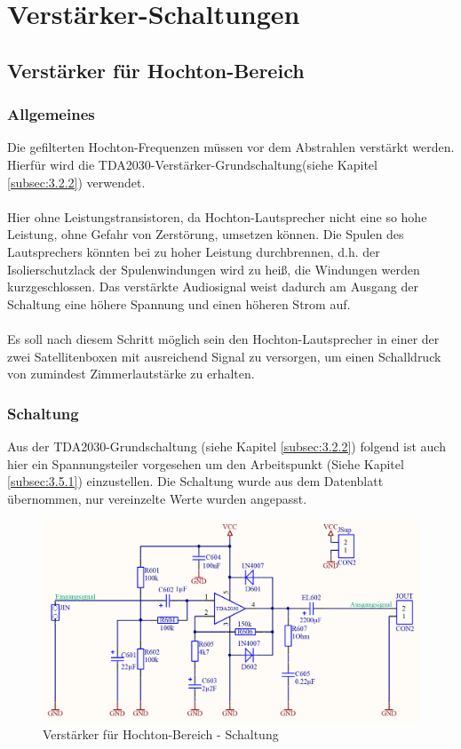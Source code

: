 \section{Verstärker-Schaltungen}


\subsection{Verstärker für Hochton-Bereich}
\subsubsection{Allgemeines}\label{subsec:4.5.1}
Die gefilterten Hochton-Frequenzen müssen vor dem Abstrahlen verstärkt werden.
Hierfür wird die TDA2030-Verstärker-Grundschaltung(siehe Kapitel \ref{subsec:3.2.2}) verwendet.
\\ \\
Hier ohne Leistungstransistoren, da Hochton-Lautsprecher nicht eine so hohe Leistung, ohne Gefahr von Zerstörung, umsetzen können.
Die Spulen des Lautsprechers könnten bei zu hoher Leistung durchbrennen, d.h. der Isolierschutzlack der Spulenwindungen wird zu heiß, die Windungen werden kurzgeschlossen.
Das verstärkte Audiosignal weist dadurch am Ausgang der Schaltung eine höhere Spannung und einen höheren Strom auf.
\\ \\
Es soll nach diesem Schritt möglich sein den Hochton-Lautsprecher in einer der zwei Satellitenboxen mit ausreichend Signal zu versorgen, um einen Schalldruck von zumindest Zimmerlautstärke zu erhalten. 

\newpage
\subsubsection{Schaltung}\label{subsec:4.5.2}
Aus der TDA2030-Grundschaltung (siehe Kapitel \ref{subsec:3.2.2}) folgend ist auch hier ein Spannungsteiler vorgesehen um den Arbeitspunkt (Siehe Kapitel \ref{subsec:3.5.1}) einzustellen.
Die Schaltung wurde aus dem Datenblatt übernommen, nur vereinzelte Werte wurden angepasst. 

\begin{figure} [H]
	\centering	
	\includegraphics[width=1\textwidth]{img/Print6/HTVerstaerker-Schem.PNG}
	\caption{Verstärker für Hochton-Bereich - Schaltung}
	\label {fig:4.5.2.1}
\end{figure}

